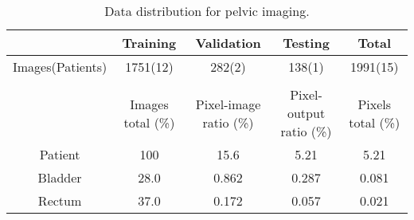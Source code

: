 \begin{table}[h]
\footnotesize
\caption{Data distribution for pelvic imaging.}
\centering
\begin{tabular}{c c c c c}
\hline\hline
& Training & Validation & Testing & Total  \\ [0.5ex]
\hline

Images(Patients) & 1751(12) & 282(2) & 138(1) & 1991(15) \\
 \\
 \hline\hline
		 & Images total (\%) & Pixel-image ratio (\%)& Pixel-output ratio (\%) & Pixels total (\%)\\ [0.5ex]
\hline
Patient  & 100 & 15.6  &  5.21 & 5.21\\
Bladder  & 28.0 & 0.862 & 0.287 & 0.081\\
Rectum   & 37.0 & 0.172 & 0.057 & 0.021\\
\hline\hline
\end{tabular}
\label{table:data_prostate}
\end{table}
